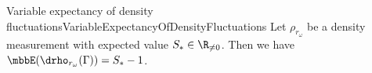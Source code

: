 \begin{mcor}{Variable expectancy of density fluctuations}{VariableExpectancyOfDensityFluctuations}
    Let $\rho_{r_\omega}$ be a density measurement with expected value $S_*\in\R_{\neq 0}$. Then we have $\mbbE(\drho_{r_\omega}(\Gamma)) = S_* - 1$.
\end{mcor}